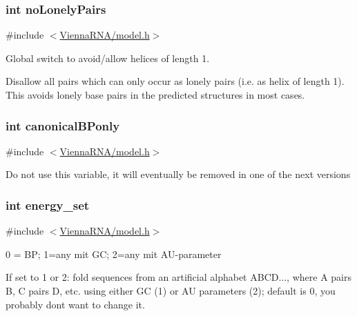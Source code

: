 \subsubsection[{no\+Lonely\+Pairs}]{\setlength{\rightskip}{0pt plus 5cm}int no\+Lonely\+Pairs}\label{group__model__details_ga097eccaabd6ae8b4fef83cccff85bb5d}


{\ttfamily \#include $<$\hyperlink{model_8h}{Vienna\+R\+N\+A/model.\+h}$>$}



Global switch to avoid/allow helices of length 1. 

Disallow all pairs which can only occur as lonely pairs (i.\+e. as helix of length 1). This avoids lonely base pairs in the predicted structures in most cases. \hypertarget{group__model__details_ga22ae821b8918930e20ffa3fa84802b4b}{}
\subsubsection[{canonical\+B\+Ponly}]{\setlength{\rightskip}{0pt plus 5cm}int canonical\+B\+Ponly}\label{group__model__details_ga22ae821b8918930e20ffa3fa84802b4b}


{\ttfamily \#include $<$\hyperlink{model_8h}{Vienna\+R\+N\+A/model.\+h}$>$}

Do not use this variable, it will eventually be removed in one of the next versions \hypertarget{group__model__details_gafb1ef1166da85092ae8a325e02dcae71}{}
\subsubsection[{energy\+\_\+set}]{\setlength{\rightskip}{0pt plus 5cm}int energy\+\_\+set}\label{group__model__details_gafb1ef1166da85092ae8a325e02dcae71}


{\ttfamily \#include $<$\hyperlink{model_8h}{Vienna\+R\+N\+A/model.\+h}$>$}



0 = B\+P; 1=any mit G\+C; 2=any mit A\+U-\/parameter 

If set to 1 or 2\+: fold sequences from an artificial alphabet A\+B\+C\+D..., where A pairs B, C pairs D, etc. using either G\+C (1) or A\+U parameters (2); default is 0, you probably don\textquotesingle{}t want to change it. \hypertarget{group__model__details_gad512b5dd4dbec60faccfe137bb474489}{}
